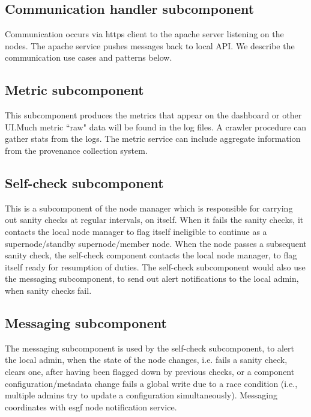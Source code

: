 \documentclass[oneside,12pt]{memoir}
\begin{document}
\subsection{Communication handler subcomponent}
Communication occurs via https client to the apache server listening on the nodes.   The apache service pushes messages back to local API.    We describe the communication use cases and patterns below.


\subsection{Metric subcomponent}

This subcomponent produces the metrics that appear on the dashboard or other UI.Much metric ``raw" data will be found in the log files.  A crawler procedure can gather stats from the logs.   The metric service can include aggregate information from the provenance collection system. 

\subsection{Self-check subcomponent}
This is a subcomponent of the node manager which is responsible for carrying out sanity checks at regular intervals, on itself. When it fails the sanity checks, it contacts the local node manager to flag itself ineligible to continue as a supernode/standby supernode/member node. When the node passes a subsequent sanity check, the self-check component contacts the local node manager, to flag itself ready for resumption of duties.  The self-check subcomponent would also use the messaging subcomponent, to send out alert notifications to the local admin, when sanity checks fail.

\subsection{Messaging subcomponent}

The messaging subcomponent is used by the self-check subcomponent, to alert the local admin, when the state of the node changes, i.e. fails a sanity check,  clears one, after having been flagged down by previous checks, or a component configuration/metadata change fails a global write due to a race condition (i.e., multiple admins try to update a configuration simultaneously).  
  Messaging coordinates with esgf node notification service.
\end{document}
